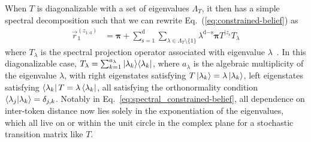 \documentclass{article}
\theoremstyle{plain}
\theoremstyle{definition}
\theoremstyle{remark}
\newcommand{\stationary}{\boldsymbol{\pi}}
\begin{document}
When $T$ is diagonalizable with a set of eigenvalues $\Lambda_T$,
it then has a simple spectral decomposition such that we can
rewrite Eq.~(\ref{eq:constrained-belief}) as
\begin{align}
     \vec{r}_1^{(z_{1:\text{d}})} 
     &= \stationary  + \sum_{\text{s}=1}^{\text{d}} 
     \sum_{\lambda \in \Lambda_T \setminus \{ 1 \}} \lambda^{\text{d}-\text{s}} \stationary
     T^{|z_{\text{s}}} 
     T_\lambda
     \label{eq:spectral_constrained-belief}
 \end{align}
 where 
$T_\lambda$ is the spectral projection operator 
associated with eigenvalue $\lambda$~\citep{Riec18_Beyond}.
In this diagonalizable case, 
$T_\lambda = \sum_{k=1}^{a_\lambda} \ket{\lambda_k} \! \bra{\lambda_k}$,
where $a_\lambda$ is the algebraic multiplicity of the eigenvalue $\lambda$, with right eigenstates satisfying $T \ket{\lambda_k} = \lambda \ket{\lambda_k}$,
left eigenstates satisfying $ \bra{\lambda_k} T = \lambda \bra{\lambda_k}$,
all satisfying the orthonormality condition $\braket{\lambda_j | \lambda_k} = \delta_{j,k}$.
Notably in Eq.~\eqref{eq:spectral_constrained-belief}, all dependence
on inter-token distance
now lies solely in the
exponentiation of the eigenvalues, which all live on or within the unit circle in the complex plane for a stochastic transition matrix like $T$.


\end{document}
